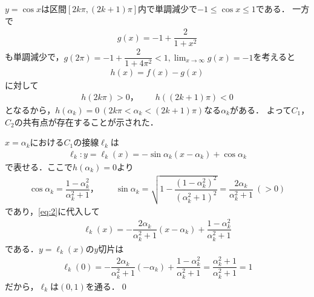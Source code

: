 \documentclass[../../main.tex]{subfiles}
\begin{document}
$y=\cos x$は区間$[2k\pi,(2k+1)\pi]$内で単調減少で$-1\le\cos x\le1$である．
一方で
\begin{align}
  g(x) = -1 + \dfrac{2}{1+x^2}
\end{align}
も単調減少で，$g(2\pi)=-1+\dfrac{2}{1+4\pi^2}<1,\lim_{x\to\infty}g(x)=-1$を考えると
\begin{align}
  h(x) = f(x) - g(x)
\end{align}
に対して
\begin{align}
  h(2k\pi) > 0，\qquad h((2k+1)\pi) < 0
\end{align}
となるから，$h(\alpha_k)=0\ (2k\pi < \alpha_k < (2k+1)\pi)$なる$\alpha_k$がある．
よって$C_1$，$C_2$の共有点が存在することが示された．

$x=\alpha_k$における$C_1$の接線$\ell_k$は
\begin{align}
  \ell_k: y=\ell_k(x)=-\sin\alpha_k(x-\alpha_k)+\cos\alpha_k \label{eq:2}
\end{align}
で表せる．ここで$h(\alpha_k)=0$より
\begin{align}
  \cos\alpha_k=\dfrac{1-\alpha_k^2}{\alpha_k^2+1}，
  \qquad
  \sin\alpha_k=\sqrt{1-\dfrac{(1-\alpha_k^2)^2}{(\alpha_k^2+1)^2}}=\dfrac{2\alpha_k}{\alpha_k^2+1}\ (>0)
\end{align}
であり，\cref{eq:2}に代入して
\begin{align}
  \ell_k(x)= -\dfrac{2\alpha_k}{\alpha_k^2+1}(x-\alpha_k) + \dfrac{1-\alpha_k^2}{\alpha_k^2+1} \label{eq:3}
\end{align}
である．$y=\ell_k(x)$の$y$切片は
\begin{align}
  \ell_k(0)
  =-\dfrac{2\alpha_k}{\alpha_k^2+1}(-\alpha_k)+\dfrac{1-\alpha_k^2}{\alpha_k^2+1}
  =\dfrac{\alpha_k^2+1}{\alpha_k^2+1}
  =1
\end{align}
だから，$\ell_k$は$(0,1)$を通る．\qed
\end{document}
